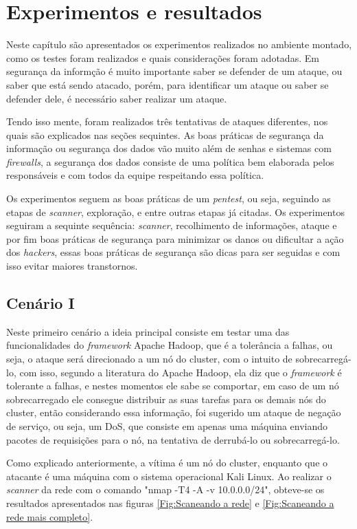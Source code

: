 \chapter{Experimentos e resultados}
\label{CAP5}

Neste capítulo são apresentados os experimentos realizados no ambiente montado, como os testes foram realizados e quais considerações foram adotadas. Em segurança da informção é muito importante saber se defender de um ataque, ou saber que está sendo atacado, porém, para identificar um ataque ou saber se defender dele, é necessário saber realizar um ataque.

Tendo isso mente, foram realizados três tentativas de ataques diferentes, nos quais são explicados nas seções sequintes. As boas práticas de segurança da informação ou segurança dos dados vão muito além de senhas e sistemas com \textit{firewalls}, a segurança dos dados consiste de uma política bem elaborada pelos responsáveis e com todos da equipe respeitando essa política.

Os experimentos seguem as boas práticas de um \textit{pentest}, ou seja, seguindo as etapas de \textit{scanner}, exploração, e entre outras etapas já citadas. Os experimentos seguiram a sequinte sequência: \textit{scanner}, recolhimento de informações, ataque e por fim boas práticas de segurança para minimizar os danos ou dificultar a ação dos \textit{hackers}, essas boas práticas de segurança são dicas para ser seguidas e com isso evitar maiores transtornos.

\section{Cenário I}

Neste primeiro cenário a ideia principal consiste em testar uma das funcionalidades do \textit{framework} Apache Hadoop, que é a tolerância a falhas, ou seja, o ataque será direcionado a um nó do cluster, com o intuito de sobrecarregá-lo, com isso, segundo a literatura do Apache Hadoop, ela diz que o \textit{framework} é tolerante a falhas, e nestes momentos ele sabe se comportar, em caso de um nó sobrecarregado ele consegue distribuir as suas tarefas para os demais nós do cluster, então considerando essa informação, foi sugerido um ataque de negação de serviço, ou seja, um DoS, que consiste em apenas uma máquina enviando pacotes de requisições para o nó, na tentativa de derrubá-lo ou sobrecarregá-lo.

Como explicado anteriormente, a vítima é um nó do cluster, enquanto que o atacante é uma máquina com o sistema operacional Kali Linux. Ao realizar o \textit{scanner} da rede com o comando "nmap -T4 -A -v 10.0.0.0/24", obteve-se os resultados apresentados nas figuras \ref{Fig:Scaneando a rede} e \ref{Fig:Scaneando a rede mais completo}.

